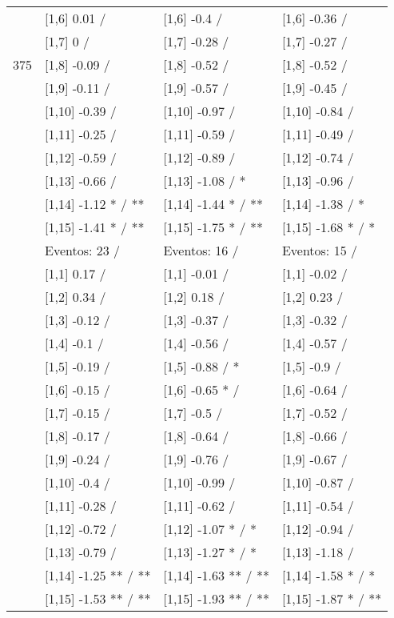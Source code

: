 \begin{table}
\begin{tabular}[t]{llll}
 & {}[1,6] 0.01  / & {}[1,6] -0.4  / & {}[1,6] -0.36  /\\
 & {}[1,7] 0  / & {}[1,7] -0.28  / & {}[1,7] -0.27  /\\
375 & {}[1,8] -0.09  / & {}[1,8] -0.52  / & {}[1,8] -0.52  /\\
\addlinespace
 & {}[1,9] -0.11  / & {}[1,9] -0.57  / & {}[1,9] -0.45  /\\
 & {}[1,10] -0.39  / & {}[1,10] -0.97  / & {}[1,10] -0.84  /\\
 & {}[1,11] -0.25  / & {}[1,11] -0.59  / & {}[1,11] -0.49  /\\
 & {}[1,12] -0.59  / & {}[1,12] -0.89  / & {}[1,12] -0.74  /\\
 & {}[1,13] -0.66  / & {}[1,13] -1.08  / * & {}[1,13] -0.96  /\\
\addlinespace
 & {}[1,14] -1.12 * / ** & {}[1,14] -1.44 * / ** & {}[1,14] -1.38  / *\\
 & {}[1,15] -1.41 * / ** & {}[1,15] -1.75 * / ** & {}[1,15] -1.68 * / *\\
 & Eventos:  23 / & Eventos:  16 / & Eventos:  15 /\\
 & {}[1,1] 0.17  / & {}[1,1] -0.01  / & {}[1,1] -0.02  /\\
 & {}[1,2] 0.34  / & {}[1,2] 0.18  / & {}[1,2] 0.23  /\\
\addlinespace
 & {}[1,3] -0.12  / & {}[1,3] -0.37  / & {}[1,3] -0.32  /\\
 & {}[1,4] -0.1  / & {}[1,4] -0.56  / & {}[1,4] -0.57  /\\
 & {}[1,5] -0.19  / & {}[1,5] -0.88  / * & {}[1,5] -0.9  /\\
 & {}[1,6] -0.15  / & {}[1,6] -0.65 * / & {}[1,6] -0.64  /\\
 & {}[1,7] -0.15  / & {}[1,7] -0.5  / & {}[1,7] -0.52  /\\
\addlinespace
500 & {}[1,8] -0.17  / & {}[1,8] -0.64  / & {}[1,8] -0.66  /\\
 & {}[1,9] -0.24  / & {}[1,9] -0.76  / & {}[1,9] -0.67  /\\
 & {}[1,10] -0.4  / & {}[1,10] -0.99  / & {}[1,10] -0.87  /\\
 & {}[1,11] -0.28  / & {}[1,11] -0.62  / & {}[1,11] -0.54  /\\
 & {}[1,12] -0.72  / & {}[1,12] -1.07 * / * & {}[1,12] -0.94  /\\
\addlinespace
 & {}[1,13] -0.79  / & {}[1,13] -1.27 * / * & {}[1,13] -1.18  /\\
 & {}[1,14] -1.25 ** / ** & {}[1,14] -1.63 ** / ** & {}[1,14] -1.58 * / *\\
 & {}[1,15] -1.53 ** / ** & {}[1,15] -1.93 ** / ** & {}[1,15] -1.87 * / **\\
\bottomrule
\end{tabular}
\end{table}
